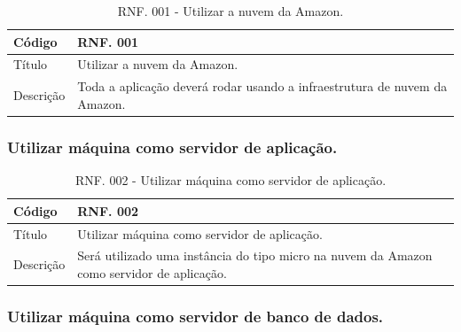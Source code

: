 \documentclass[11pt]{article}
\begin{document}
        \begin{table}[h]
          \begin{center}
            \begin{tabular}{ | p{5cm} | p{10cm} | }
              \hline
              Código\cellcolor{gray} & RNF. 001\cellcolor{gray} \\
              \hline
              Título & Utilizar a nuvem da Amazon. \\
              \hline
              Descrição & Toda a aplicação deverá rodar usando a infraestrutura de nuvem da Amazon. \\
              \hline
            \end{tabular}
            \caption{RNF. 001 - Utilizar a nuvem da Amazon.}
          \end{center}
        \end{table}

      \subsubsection{Utilizar máquina como servidor de aplicação.}

        \begin{table}[h]
          \begin{center}
            \begin{tabular}{ | p{5cm} | p{10cm} | }
              \hline
              Código\cellcolor{gray} & RNF. 002\cellcolor{gray} \\
              \hline
              Título & Utilizar máquina como servidor de aplicação. \\
              \hline
              Descrição & Será utilizado uma instância do tipo micro na nuvem da Amazon como servidor de aplicação. \\
              \hline
            \end{tabular}
            \caption{RNF. 002 - Utilizar máquina como servidor de aplicação.}
          \end{center}
        \end{table}

      \subsubsection{Utilizar máquina como servidor de banco de dados.}
\end{document}
